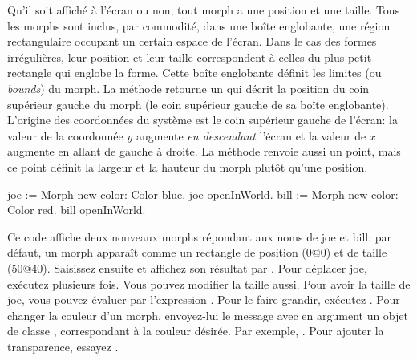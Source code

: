 \documentclass[a4paper,10pt,twoside]{book}
\begin{document}
Qu'il soit affiché \`a l'écran ou non, tout morph a une position
et une taille. Tous les morphs sont inclus, par commodité, dans une
boîte englobante, \cad une région rectangulaire occupant un
certain espace de l'écran. Dans le cas des formes irrégulières,
leur position et leur taille correspondent \`a celles du plus petit
rectangle qui englobe la forme. Cette boîte englobante définit
les limites (ou \emph{bounds}) du morph. %
La méthode  retourne un  qui
décrit la position du coin supérieur gauche du morph (\cad le coin
supérieur gauche de sa boîte englobante).
L'origine des coordonnées du système est le coin supérieur
gauche de l'écran: la valeur de la coordonnée $y$ augmente
\emph{en descendant} l'écran et la valeur de $x$ augmente en allant
de gauche \`a droite.
La méthode  renvoie aussi un point, mais ce point
définit la largeur et la hauteur du morph plutôt qu'une position.

\begin{code}{}
joe := Morph new color: Color blue.
joe openInWorld.
bill := Morph new color: Color red.
bill openInWorld.
\end{code}
\noindent

Ce code affiche deux nouveaux morphs répondant aux noms de joe et
bill: par défaut, un morph apparaît comme  un rectangle de
position (0@0) et de taille (50@40).
Saisissez ensuite  et affichez son résultat par .
Pour déplacer joe, exécutez  plusieurs fois.
Vous pouvez modifier la taille aussi. Pour avoir la taille de joe,
vous pouvez évaluer par  l'expression 
. Pour le faire grandir, exécutez .
Pour changer la couleur d'un morph, envoyez-lui le message
 avec en argument un objet de classe ,
correspondant \`a la couleur désirée. Par exemple,
.
Pour ajouter la transparence, essayez
.
\end{document}
